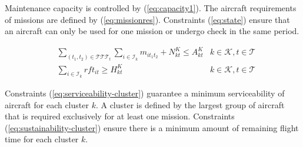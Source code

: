 \documentclass[a4paper,onecolumn,fleqn]{article}
\begin{document}
    Maintenance capacity is controlled by (\ref{eq:capacity1}). The aircraft requirements of missions are defined by (\ref{eq:missionres}). Constraints (\ref{eq:state}) ensure that an aircraft can only be used for one mission or undergo check in the same period.




    \begin{align}
       & \sum_{(t_1, t_2) \in \mathcal{T}\mathcal{T}\mathcal{T}_{t}} \sum_{i \in \mathcal{I}_k} m_{it_1t_2} + N^K_{kt} \leq A^K_{kt}
        &k \in \mathcal{K}, t \in \mathcal{T} \label{eq:serviceability-cluster} \\
       & \sum_{i \in \mathcal{I}_k} rft_{it} \geq H^K_{kt}
        &k \in \mathcal{K}, t \in \mathcal{T} \label{eq:sustainability-cluster}
    \end{align}

    Constraints (\ref{eq:serviceability-cluster}) guarantee a minimum serviceability of aircraft for each cluster $k$. A cluster is defined by the largest group of aircraft that is required exclusively for at least one mission. Constraints (\ref{eq:sustainability-cluster}) ensure there is a minimum amount of remaining flight time for each cluster $k$.
\end{document}
